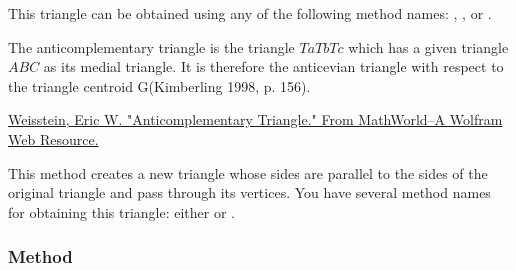 \medskip

This triangle can be obtained using any of the following method names: , , or .

\vspace{1em}



The anticomplementary triangle is the triangle $TaTbTc$ which has a given triangle $ABC$ as its medial triangle. It is therefore the anticevian triangle with respect to the triangle centroid G(Kimberling 1998, p. 156).\begin{flushright}
  \small
 \href{https://mathworld.wolfram.com/AnticomplementaryTriangle.html}{Weisstein, Eric W. "Anticomplementary Triangle." From MathWorld--A Wolfram Web Resource.}
\end{flushright}

This method creates a new triangle whose sides are parallel to the sides of the original triangle and pass through its vertices.
You have several method names for obtaining this triangle: either   or .

\vspace{1em}

\begin{minipage}{.5\textwidth}
\begin{center}
\end{center}
\end{minipage}
\begin{minipage}{.5\textwidth}
\begin{tkzexample}
\end{tkzexample}
\end{minipage}

\subsubsection{Method }
\label{ssub:method_triangle_lemoine}

